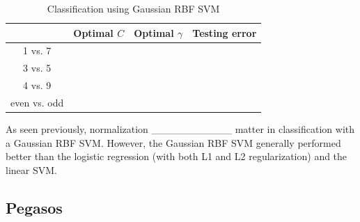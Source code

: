 \documentclass{article}
\begin{document}
\begin{table}
  \begin{center}
    \begin{tabular}{ | c | c | c | c | }
      \hline
                     & Optimal $C$    & Optimal $\gamma$     & Testing error      \\ \hline
      1 vs. 7        &                &                      &                    \\ \hline
      3 vs. 5        &                &                      &                    \\ \hline
      4 vs. 9        &                &                      &                    \\ \hline
      even vs. odd   &                &                      &                    \\ \hline
    \end{tabular}
  \end{center}
  \caption{Classification using Gaussian RBF SVM}
\end{table}

As seen previously, normalization \_\_\_\_\_\_\_\_\_\_\_ matter in classification with a Gaussian RBF SVM. However, the Gaussian RBF SVM generally performed better than the logistic regression (with both L1 and L2 regularization) and the linear SVM.

\subsection{Pegasos }
\end{document}
